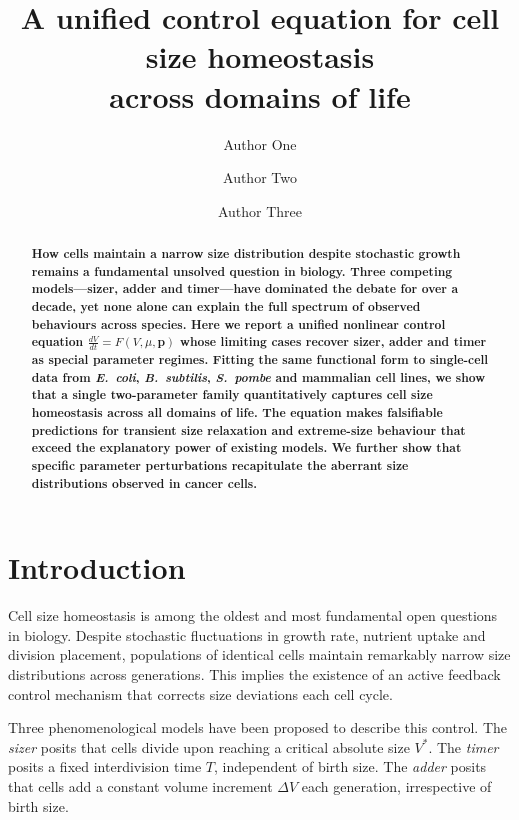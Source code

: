 \documentclass[11pt]{article}
\title{%
  \textbf{A unified control equation for cell size homeostasis\\
  across domains of life}
}
\author[1]{Author One}
\author[1,2]{Author Two}
\author[3]{Author Three}
\affil[1]{Department of Systems Biology, University, City, Country}
\affil[2]{Department of Physics, University, City, Country}
\affil[3]{Department of Computational Biology, University, City, Country}
\date{}
\newcommand{\DeltaV}{\Delta V}
\newcommand{\Vstar}{V^{*}}
\newcommand{\Ecoli}{\textit{E.~coli}}
\newcommand{\Spombe}{\textit{S.~pombe}}
\newcommand{\Bsubtilis}{\textit{B.~subtilis}}
\begin{document}
\maketitle

\begin{abstract}
\noindent
\textbf{%
How cells maintain a narrow size distribution despite stochastic growth
remains a fundamental unsolved question in biology.
Three competing models---sizer, adder and timer---have dominated the
debate for over a decade, yet none alone can explain the full spectrum
of observed behaviours across species.
Here we report a unified nonlinear control equation
$\frac{dV}{dt} = F(V, \mu, \mathbf{p})$
whose limiting cases recover sizer, adder and timer as special
parameter regimes.
Fitting the same functional form to single-cell data from \Ecoli{},
\Bsubtilis{}, \Spombe{} and mammalian cell lines, we show that a
single two-parameter family quantitatively captures cell size
homeostasis across all domains of life.
The equation makes falsifiable predictions for transient size
relaxation and extreme-size behaviour that exceed the explanatory
power of existing models.
We further show that specific parameter perturbations recapitulate
the aberrant size distributions observed in cancer cells.%
}
\end{abstract}


\section*{Introduction}

Cell size homeostasis is among the oldest and most fundamental open
questions in biology\cite{nurse1975,fantes1977,science125}.
Despite stochastic fluctuations in growth rate, nutrient uptake and
division placement, populations of identical cells maintain remarkably
narrow size distributions across generations.
This implies the existence of an active feedback control mechanism
that corrects size deviations each cell cycle.

Three phenomenological models have been proposed to describe this
control.  The \textit{sizer} posits that cells divide upon reaching a
critical absolute size $\Vstar$\cite{fantes1977,nurse1975}.
The \textit{timer} posits a fixed interdivision time $T$,
independent of birth size\cite{donnan1983}.
The \textit{adder} posits that cells add a constant volume increment
$\DeltaV$ each generation, irrespective of birth
size\cite{campos2014,taheri2015}.
\end{document}
